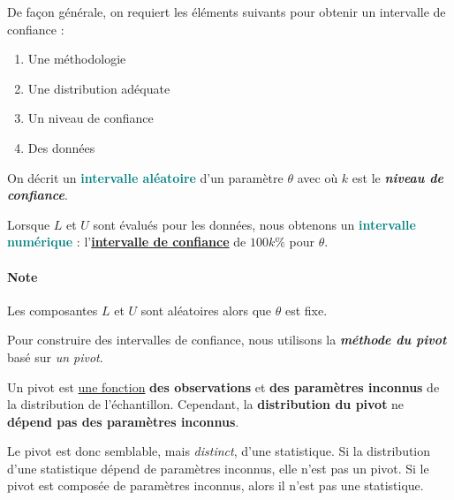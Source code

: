 \documentclass[french]{article}
\begin{document}
\begin{multicols*}{2}
\begin{rappel_enhanced}[Contexte]
\bigskip

De façon générale, on requiert les éléments suivants pour obtenir un intervalle de confiance :
\begin{enumerate}[label = \rectangled{\arabic*}{lightgray}]
	\item	Une méthodologie
	\item	Une distribution adéquate
	\item	Un niveau de confiance
	\item	Des données
\end{enumerate}
\end{rappel_enhanced}

\begin{definitionNOHFILL}
On décrit un \textbf{\textcolor{teal}{intervalle aléatoire}}  d'un paramètre $\theta$ avec  où $k$ est le \textit{\textbf{niveau de confiance}}. 

\bigskip

Lorsque $L$ et $U$ sont évalués pour les données, nous obtenons un \textbf{\textcolor{teal}{intervalle numérique}} : l'\textbf{\underline{intervalle de confiance}}  de $100k\%$ pour $\theta$.


\paragraph{Note}	Les composantes $L$ et $U$ sont aléatoires alors que $\theta$ est fixe.
\end{definitionNOHFILL}

\bigskip

Pour construire des intervalles de confiance, nous utilisons la \textbf{\textit{méthode du pivot}} basé sur \textit{un pivot}.

\begin{definitionNOHFILLsub}
Un pivot est \underline{une fonction} \textbf{des observations} et \textbf{des paramètres inconnus} de la distribution de l'échantillon. Cependant, la \textbf{distribution du pivot} ne \textbf{dépend pas des paramètres inconnus}.

\bigskip	

Le pivot est donc semblable, mais \textit{distinct}, d'une statistique. Si la distribution d'une statistique dépend de paramètres inconnus, elle n'est pas un pivot. Si le pivot est composée de paramètres inconnus, alors il n'est pas une statistique.


\end{definitionNOHFILLsub}
\end{multicols*}
\end{document}
